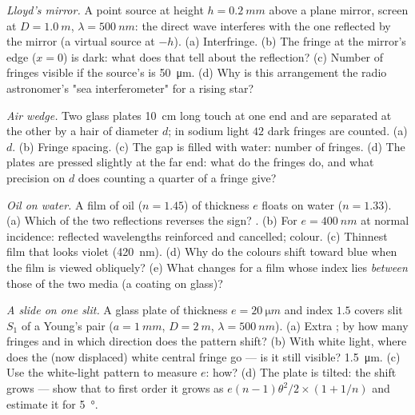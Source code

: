 \begin{exercise}[$\star\star$]\label{exo:b2:two-wave-interference:7}
\emph{Lloyd's mirror.} A point source at height $h = \qty{0.2}{mm}$ above a
plane mirror, screen at $D = \qty{1.0}{m}$, $\lambda = \qty{500}{nm}$: the direct wave
interferes with the one reflected by the mirror (a virtual source at
$-h$). (a) Interfringe. (b) The fringe at the mirror's edge ($x = 0$) is
dark: what does that tell about the reflection? (c) Number of fringes
visible if the source's  is \qty{50}{\micro m}. (d) Why is
this arrangement the radio astronomer's "sea interferometer" for a
rising star?
\end{exercise}

\begin{exercise}[$\star\star$]\label{exo:b2:two-wave-interference:8}
\emph{Air wedge.} Two glass plates \qty{10}{cm} long touch at one end and
are separated at the other by a hair of diameter $d$; in sodium light
$42$ dark fringes are counted. (a) $d$. (b) Fringe spacing. (c) The gap
is filled with water: number of fringes. (d) The plates are pressed
slightly at the far end: what do the fringes do, and what precision on
$d$ does counting a quarter of a fringe give?
\end{exercise}

\begin{exercise}[$\star\star$]\label{exo:b2:two-wave-interference:9}
\emph{Oil on water.} A film of oil ($n = 1.45$) of thickness $e$ floats
on water ($n = 1.33$). (a) Which of the two reflections reverses the
sign? . (b) For $e = \qty{400}{nm}$ at normal incidence:
reflected wavelengths reinforced and cancelled; colour. (c) Thinnest
film that looks violet (\qty{420}{nm}). (d) Why do the colours shift toward
blue when the film is viewed obliquely? (e) What changes for a film
whose index lies \emph{between} those of the two media (a coating on
glass)?
\end{exercise}

\begin{exercise}[$\star\star\star$]\label{exo:b2:two-wave-interference:10}
\emph{A slide on one slit.} A glass plate of thickness $e = \qty{20}{\micro m}$
and index $1.5$ covers slit $S_1$ of a Young's pair ($a = \qty{1}{mm}$, $D =
\qty{2}{m}$, $\lambda = \qty{500}{nm}$). (a) Extra ; by how many fringes
and in which direction does the pattern shift? (b) With white light,
where does the (now displaced) white central fringe go --- is it still
visible?  \qty{1.5}{\micro m}. (c) Use the white-light
pattern to measure $e$: how? (d) The plate is tilted: the shift grows
--- show that to first order it grows as $e(n - 1)\theta^2/2 \times (1 + 1/n)$
and estimate it for \qty{5}{\degree}.
\end{exercise}

